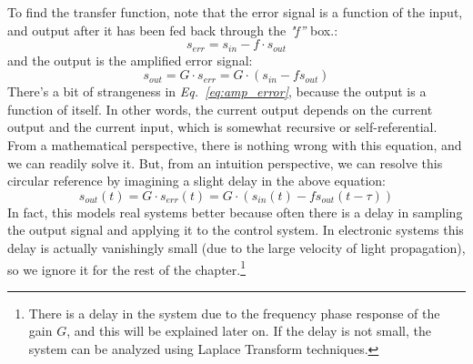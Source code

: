 To find the transfer function, note that the error signal is a function of the input, and output after it has been fed back through the \emph{"f''} box.:
    \begin{equation}
        {s_{err}} = {s_{in}} - f \cdot {s_{out}}
    \end{equation}
and the output is the amplified error signal:
    \begin{equation}
        {s_{out}} = G \cdot {s_{err}} = G \cdot ({s_{in}} - f{s_{out}})
        \label{eq:amp_error}
    \end{equation}
\newpage
There's a bit of strangeness in \emph{Eq.~\ref{eq:amp_error}},  because the output is a function of itself.  In other words, the current output depends on the current output and the current input, which is somewhat recursive or self-referential.  From a mathematical perspective, there is nothing wrong with this equation, and we can readily solve it.  But, from an intuition perspective, we can resolve this circular reference by imagining a slight delay in the above equation:
    \begin{equation}
        {s_{out}(t)} = G \cdot {s_{err}(t) } = G \cdot ({s_{in}(t)} - f{s_{out}(t-\tau)})
    \end{equation}
In fact, this models real systems better because often there is a delay in sampling the output signal and applying it to the control system.  In electronic systems this delay is actually vanishingly small (due to the large velocity of light propagation), so we ignore it for the rest of the chapter.\footnote{There is a delay in the system due to the frequency phase response of the gain $G$, and this will be explained later on.  If the delay is not small, the system can be analyzed using Laplace Transform techniques.}  
